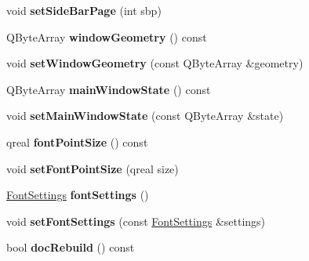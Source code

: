 \begin{DoxyCompactItemize}
\item 
\hypertarget{classConfig_a7f5dd0a0fe91bffe00fb654e9305ee60}{
void {\bfseries setSideBarPage} (int sbp)}
\label{classConfig_a7f5dd0a0fe91bffe00fb654e9305ee60}

\item 
\hypertarget{classConfig_a594f346ab59c8fe83769aa7fe7039c2f}{
QByteArray {\bfseries windowGeometry} () const }
\label{classConfig_a594f346ab59c8fe83769aa7fe7039c2f}

\item 
\hypertarget{classConfig_a44214113cd4770955746c31be04486b7}{
void {\bfseries setWindowGeometry} (const QByteArray \&geometry)}
\label{classConfig_a44214113cd4770955746c31be04486b7}

\item 
\hypertarget{classConfig_a92e909818cde5a40b661299a9932c595}{
QByteArray {\bfseries mainWindowState} () const }
\label{classConfig_a92e909818cde5a40b661299a9932c595}

\item 
\hypertarget{classConfig_ad14c9b7e76a4ec2129acdf968f0376f6}{
void {\bfseries setMainWindowState} (const QByteArray \&state)}
\label{classConfig_ad14c9b7e76a4ec2129acdf968f0376f6}

\item 
\hypertarget{classConfig_ab262f5ec517fc82dfb602eb0d7817769}{
qreal {\bfseries fontPointSize} () const }
\label{classConfig_ab262f5ec517fc82dfb602eb0d7817769}

\item 
\hypertarget{classConfig_a5e3cb6ccc01f9bd580d35e820eae9702}{
void {\bfseries setFontPointSize} (qreal size)}
\label{classConfig_a5e3cb6ccc01f9bd580d35e820eae9702}

\item 
\hypertarget{classConfig_adcbbe3ea5bea7c22b776c88c90b7bae5}{
\hyperlink{structFontSettings}{FontSettings} {\bfseries fontSettings} ()}
\label{classConfig_adcbbe3ea5bea7c22b776c88c90b7bae5}

\item 
\hypertarget{classConfig_af85535967937755ae87bb18dffc5d837}{
void {\bfseries setFontSettings} (const \hyperlink{structFontSettings}{FontSettings} \&settings)}
\label{classConfig_af85535967937755ae87bb18dffc5d837}

\item 
\hypertarget{classConfig_a0a3602d5c0e627b4cfe1b9cdd751809c}{
bool {\bfseries docRebuild} () const }
\label{classConfig_a0a3602d5c0e627b4cfe1b9cdd751809c}


\end{DoxyCompactItemize}
